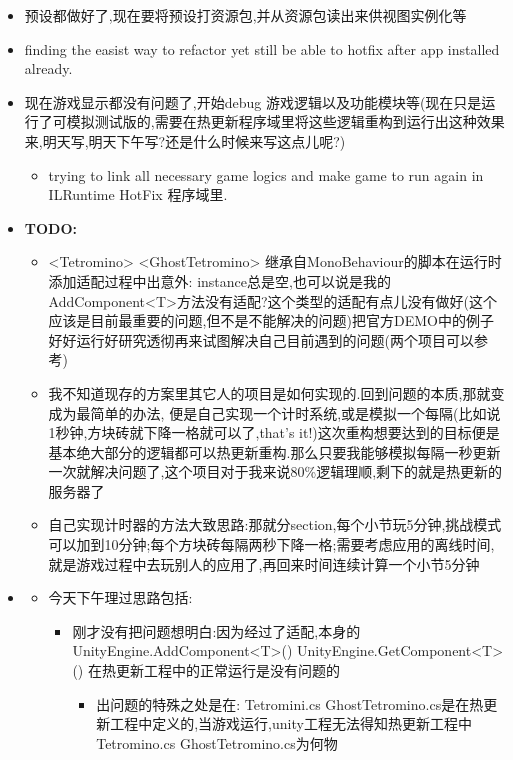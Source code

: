 \documentclass[9pt, b5paper]{article}
\begin{document}
\begin{itemize}
\item 预设都做好了,现在要将预设打资源包,并从资源包读出来供视图实例化等
\item finding the easist way to refactor yet still be able to hotfix after app installed already.
\item 现在游戏显示都没有问题了,开始debug 游戏逻辑以及功能模块等(现在只是运行了可模拟测试版的,需要在热更新程序域里将这些逻辑重构到运行出这种效果来,明天写,明天下午写?还是什么时候来写这点儿呢?)
\begin{itemize}
\item trying to link all necessary game logics and make game to run again in ILRuntime HotFix 程序域里.
\end{itemize}
\item \textbf{TODO:}
\begin{itemize}
\item <Tetromino> <GhostTetromino> 继承自MonoBehaviour的脚本在运行时添加适配过程中出意外: instance总是空,也可以说是我的AddComponent<T>方法没有适配?这个类型的适配有点儿没有做好(这个应该是目前最重要的问题,但不是不能解决的问题)把官方DEMO中的例子好好运行好研究透彻再来试图解决自己目前遇到的问题(两个项目可以参考)
\item 我不知道现存的方案里其它人的项目是如何实现的.回到问题的本质,那就变成为最简单的办法, 便是自己实现一个计时系统,或是模拟一个每隔(比如说1秒钟,方块砖就下降一格就可以了,that's it!)这次重构想要达到的目标便是基本绝大部分的逻辑都可以热更新重构.那么只要我能够模拟每隔一秒更新一次就解决问题了,这个项目对于我来说80\%逻辑理顺,剩下的就是热更新的服务器了
\item 自己实现计时器的方法大致思路:那就分section,每个小节玩5分钟,挑战模式可以加到10分钟;每个方块砖每隔两秒下降一格;需要考虑应用的离线时间,就是游戏过程中去玩别人的应用了,再回来时间连续计算一个小节5分钟
\end{itemize}
\item \begin{itemize}
\item 今天下午理过思路包括:
\begin{itemize}
\item 刚才没有把问题想明白:因为经过了适配,本身的UnityEngine.AddComponent<T>() UnityEngine.GetComponent<T>() 在热更新工程中的正常运行是没有问题的
\begin{itemize}
\item 出问题的特殊之处是在: Tetromini.cs GhostTetromino.cs是在热更新工程中定义的,当游戏运行,unity工程无法得知热更新工程中Tetromino.cs GhostTetromino.cs为何物

\end{itemize}
\end{itemize}
\end{itemize}
\end{itemize}
\end{document}
